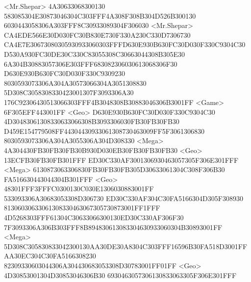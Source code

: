 <Mr.Shepar> {4A}{30}{63}{30}{68}{30}{01}{30} {58}{30}{85}{30}{4E}{30}{87}{30}{46}{30}{4C}{30}{3F}{FF}{4A}{30}{8F}{30}{8B}{30}{4D}{52}{6B}{30}{01}{30} {60}{30}{44}{30}{58}{30}{6A}{30}{3F}{FF}{8C}{30}{93}{30}{89}{30}{4F}{30}{60}{30} 
<Mr.Shepar> {CA}{4E}{DE}{56}{6E}{30}{D0}{30}{FC}{30}{B8}{30}{E7}{30}{F3}{30}{A2}{30}{C3}{30}{D7}{30}{67}{30} {CA}{4E}{7E}{30}{67}{30}{80}{30}{59}{30}{93}{30}{60}{30}{3F}{FF}{D6}{30}{E9}{30}{B6}{30}{FC}{30}{D0}{30}{F3}{30}{C9}{30}{4C}{30} {D5}{30}{A9}{30}{FC}{30}{DE}{30}{C3}{30}{C8}{30}{55}{30}{8C}{30}{66}{30}{44}{30}{8B}{30}{5E}{30} 
{6A}{30}{4B}{30}{88}{30}{57}{30}{6E}{30}{3F}{FF}{68}{30}{82}{30}{60}{30}{61}{30}{68}{30}{6F}{30} {D6}{30}{E9}{30}{B6}{30}{FC}{30}{D0}{30}{F3}{30}{C9}{30}{92}{30} {80}{30}{59}{30}{73}{30}{6A}{30}{4A}{30}{57}{30}{66}{30}{4A}{30}{51}{30}{88}{30} 
{5D}{30}{8C}{30}{58}{30}{83}{30}{42}{30}{01}{30}{7F}{30}{93}{30}{6A}{30} {17}{6C}{92}{30}{64}{30}{51}{30}{66}{30}{3F}{FF}{4B}{30}{48}{30}{8B}{30}{88}{30}{46}{30}{6B}{30}{01}{FF} 
<Game> {6F}{30}{5E}{FF}{44}{30}{01}{FF} 
<Geo> {D6}{30}{E9}{30}{B6}{30}{FC}{30}{D0}{30}{F3}{30}{C9}{30}{4C}{30} {4D}{30}{48}{30}{61}{30}{83}{30}{63}{30}{66}{30}{8B}{30}{93}{30}{60}{30}{FB}{30}{FB}{30}{FB}{30} 
{D4}{59}{E1}{54}{77}{95}{08}{FF}{44}{30}{44}{30}{93}{30}{61}{30}{87}{30}{46}{30}{09}{FF}{5F}{30}{61}{30}{68}{30} {80}{30}{59}{30}{73}{30}{6A}{30}{4A}{30}{55}{30}{6A}{30}{4D}{30}{83}{30} 
<Mega> {4A}{30}{44}{30}{FB}{30}{FB}{30}{FB}{30}{B9}{30}{D0}{30}{EB}{30}{FB}{30}{FB}{30}{FB}{30} 
<Geo> {13}{EC}{FB}{30}{FB}{30}{FB}{30}{1F}{FF} 
{ED}{30}{C3}{30}{AF}{30}{01}{30}{69}{30}{46}{30}{57}{30}{5F}{30}{6E}{30}{1F}{FF} 
<Mega> {61}{30}{87}{30}{63}{30}{68}{30}{FB}{30}{FB}{30}{FB}{30}{5D}{30}{63}{30}{61}{30}{4C}{30}{8F}{30}{6B}{30} {FA}{51}{66}{30}{44}{30}{44}{30}{4B}{30}{1F}{FF} 
<Geo> {48}{30}{1F}{FF}{3F}{FF}{C0}{30}{01}{30}{C0}{30}{E1}{30}{60}{30}{88}{30}{01}{FF} 
{53}{30}{93}{30}{6A}{30}{68}{30}{53}{30}{8D}{30}{67}{30} {ED}{30}{C3}{30}{AF}{30}{4C}{30}{FA}{51}{66}{30}{4D}{30}{5F}{30}{89}{30} {81}{30}{60}{30}{63}{30}{61}{30}{83}{30}{46}{30}{67}{30}{57}{30}{87}{30}{01}{FF}{1F}{FF} 
{4D}{52}{68}{30}{3F}{FF}{61}{30}{4C}{30}{63}{30}{66}{30}{01}{30}{ED}{30}{C3}{30}{AF}{30}{6F}{30} {7F}{30}{93}{30}{6A}{30}{6B}{30}{3F}{FF}{8B}{89}{48}{30}{61}{30}{83}{30}{46}{30}{93}{30}{60}{30}{4B}{30}{89}{30}{01}{FF} 
<Mega> {5D}{30}{8C}{30}{58}{30}{83}{30}{42}{30}{01}{30}{AA}{30}{DE}{30}{A8}{30}{4C}{30}{3F}{FF}{16}{59}{6B}{30}{FA}{51}{8D}{30}{01}{FF} {AA}{30}{EC}{30}{4C}{30}{FA}{51}{66}{30}{82}{30} {82}{30}{93}{30}{60}{30}{44}{30}{6A}{30}{44}{30}{68}{30}{53}{30}{8D}{30}{78}{30}{01}{FF}{01}{FF} 
<Geo> {4D}{30}{85}{30}{01}{30}{4D}{30}{85}{30}{46}{30}{6B}{30} {69}{30}{46}{30}{57}{30}{61}{30}{83}{30}{63}{30}{5F}{30}{6E}{30}{1F}{FF} 
